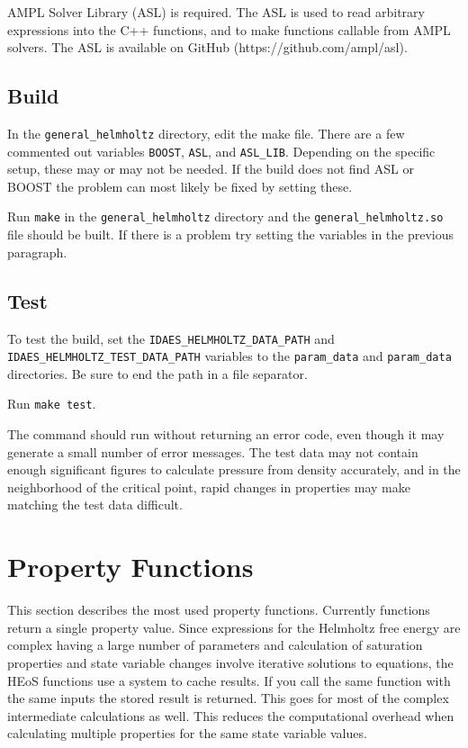 \documentclass[oneside]{book}
\begin{document}
AMPL Solver Library (ASL) is required. The ASL is used to read arbitrary expressions into the C++ functions, and to make functions callable from AMPL solvers.  The ASL is available on GitHub (https://github.com/ampl/asl).

\section{Build}

In the \texttt{general\_helmholtz} directory, edit the make file.  There are a few commented out variables \texttt{BOOST}, \texttt{ASL}, and \texttt{ASL\_LIB}.  Depending on the specific setup, these may or may not be needed.  If the build does not find ASL or BOOST the problem can most likely be fixed by setting these.

Run \texttt{make} in the \texttt{general\_helmholtz} directory and the \texttt{general\_helmholtz.so} file should be built.  If there is a problem try setting the variables in the previous paragraph.

\section{Test}

To test the build, set the \texttt{IDAES\_HELMHOLTZ\_DATA\_PATH} and \texttt{IDAES\_HELMHOLTZ\_TEST\_DATA\_PATH} variables to the \texttt{param\_data} and \texttt{param\_data} directories. Be sure to end the path in a file separator.

Run \texttt{make test}.

The command should run without returning an error code, even though it may generate a small number of error messages.  The test data may not contain enough significant figures to calculate pressure from density accurately, and in the neighborhood of the critical point, rapid changes in properties may make matching the test data difficult. 

\chapter{Property Functions}

This section describes the most used property functions.  Currently functions return a single property value. Since expressions for the Helmholtz free energy are complex having a large number of parameters and calculation of saturation properties and state variable changes involve iterative solutions to equations, the HEoS functions use a system to cache results.  If you call the same function with the same inputs the stored result is returned.  This goes for most of the complex intermediate calculations as well.  This reduces the computational overhead when calculating multiple properties for the same state variable values.
\end{document}
